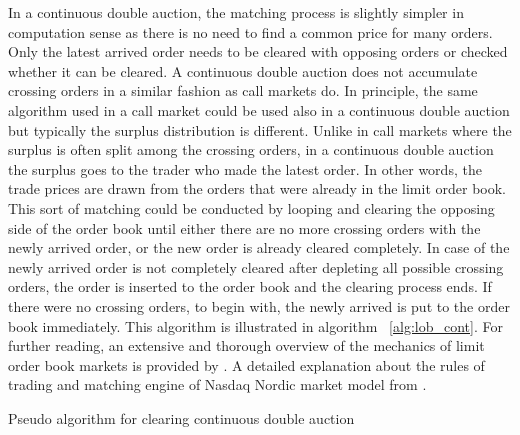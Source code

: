 In a continuous double auction, the matching process is slightly simpler in computation
sense as there is no need to find a common price for many orders. Only the latest arrived
order needs to be cleared with opposing orders or checked whether it can be cleared. A continuous
double auction does not accumulate crossing orders in a similar fashion as call markets do. 
In principle, the same algorithm used in a call market could be used also in a continuous double auction 
but typically the surplus distribution is different. Unlike in call markets where the surplus is often
split among the crossing orders, in a continuous double auction the surplus goes to the trader who made the 
latest order. In other words, the trade prices are drawn from the orders that were already in the limit 
order book. This sort of matching could be conducted by looping and clearing the opposing side of the 
order book until either there are no more crossing orders with the newly arrived order, or the new 
order is already cleared completely. In case of the newly arrived order is not completely cleared after 
depleting all possible crossing orders, the order is inserted to the order book and the clearing process 
ends. If there were no crossing orders, to begin with, the newly arrived is put to the order book immediately. 
This algorithm is illustrated in algorithm ~\ref{alg:lob_cont}. For further reading, an extensive and 
thorough overview of the mechanics of limit order book markets is provided by \citet{lob13}. A detailed 
explanation about the rules of trading and matching engine of Nasdaq Nordic market model from \citet{NasdaqModel}.

\begin{algorithm}[H]
    \SetAlgoLined
    \DontPrintSemicolon

    \caption{Pseudo algorithm for clearing continuous double auction}
    \label{alg:lob_cont}
\end{algorithm}


